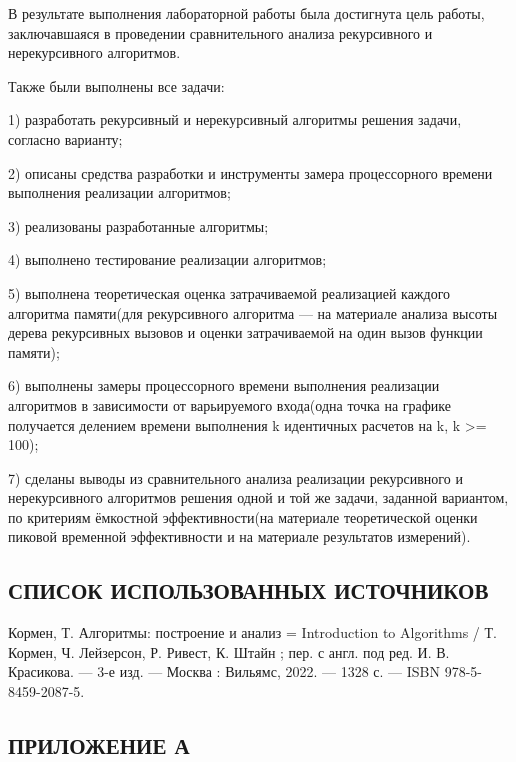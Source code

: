 \documentclass[14pt]{article}
\begin{document}
	В результате выполнения лабораторной работы была достигнута цель работы, заключавшаяся в проведении сравнительного анализа рекурсивного и нерекурсивного алгоритмов.\par
	Также были выполнены все задачи:\par
	1) разработать рекурсивный и нерекурсивный алгоритмы решения задачи, согласно варианту;\par
	2) описаны средства разработки и инструменты замера процессорного времени выполнения реализации алгоритмов;\par
	3) реализованы разработанные алгоритмы;\par
	4) выполнено тестирование реализации алгоритмов;\par
	5) выполнена теоретическая оценка затрачиваемой реализацией каждого алгоритма памяти(для рекурсивного алгоритма --- на материале анализа высоты дерева рекурсивных вызовов и оценки затрачиваемой на один вызов функции памяти);\par
	6) выполнены замеры процессорного времени выполнения реализации алгоритмов в зависимости от варьируемого входа(одна точка на графике получается делением времени выполнения k идентичных расчетов на k, k >= 100);\par
	7) сделаны выводы из сравнительного анализа реализации рекурсивного и нерекурсивного алгоритмов решения одной и той же задачи, заданной вариантом, по критериям ёмкостной эффективности(на материале теоретической оценки пиковой временной эффективности и на материале результатов измерений).
	\newpage
	\begin{center}
		\section*{СПИСОК ИСПОЛЬЗОВАННЫХ ИСТОЧНИКОВ}
	\end{center}
	
	\makeatletter
	\renewcommand{\@biblabel}[1]{#1.}
	\makeatother
	
	\renewcommand{\refname}{}
	\begin{thebibliography}{0}
		 Кормен, Т. Алгоритмы: построение и анализ = Introduction to Algorithms / Т. Кормен, Ч. Лейзерсон, Р. Ривест, К. Штайн ; пер. с англ. под ред. И. В. Красикова. — 3-е изд. — Москва : Вильямс, 2022. — 1328 с. — ISBN 978-5-8459-2087-5.
	\end{thebibliography}
	\newpage
	\begin{center}
		\section*{ПРИЛОЖЕНИЕ А}
	\end{center}
	
\end{document}
